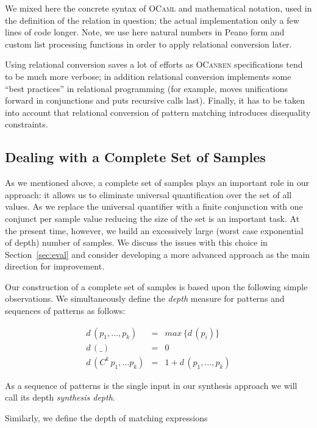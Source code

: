 We mixed here the concrete syntax of \textsc{OCaml} and mathematical notation, used in the definition of the relation in question; the actual
implementation only a few lines of code longer. Note, we use here natural numbers in Peano form and custom list processing functions in order
to apply relational conversion later.

Using relational conversion saves a lot of efforts as \textsc{OCanren} specifications tend to be much more verbose; in addition
relational conversion implements some ``best practices'' in relational programming (for example, moves unifications forward in
conjunctions and puts recursive calls last). Finally, it has to be taken into account that relational conversion of pattern matching introduces
disequality constraints.

\subsection{Dealing with a Complete Set of Samples}
\label{sec:samples}

As we mentioned above, a complete set of samples plays an important role in our approach: it allows us to eliminate universal quantification over the
set of all values. As we replace the universal quantifier with a finite conjunction with one conjunct per sample value reducing the size of
the set is an important task. At the present time, however, we build an excessively large (worst case exponential of depth) number of samples. We discuss
the issues with this choice in Section~\ref{sec:eval} and consider developing a more advanced approach as the main direction for
improvement.

Our construction of a complete set of samples is based upon the following simple observations. We simultaneously define the \emph{depth} measure
for patterns and sequences of patterns as follows:

\[
\begin{array}{rcl}
   d\,(p_1,\dots,p_k)     & = & max\, \{ d\,(p_i)\}\\
   d\,(\_)                 & = & 0 \\
   d\,(C^k\,p_1,\dots p_k) & = & 1 + d\,(p_1,\dots,p_k)
\end{array}
\]

\noindent As a sequence of patterns is the single input in our synthesis approach we will call its depth \emph{synthesis depth}.

Similarly, we define the depth of matching expressions

